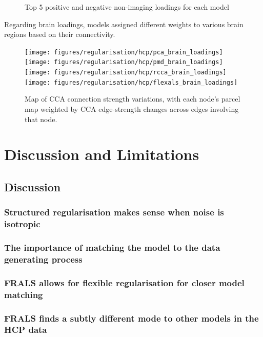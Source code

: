 \begin{figure}[h]
\centering

\caption*{Top 5 positive and negative non-imaging loadings for each model}
\label{fig:behaviour}
\end{figure}

Regarding brain loadings, models assigned different weights to various brain regions based on their connectivity.

\begin{figure}[h]
\centering
\texttt{[image: figures/regularisation/hcp/pca\_brain\_loadings]}
\texttt{[image: figures/regularisation/hcp/pmd\_brain\_loadings]}
\texttt{[image: figures/regularisation/hcp/rcca\_brain\_loadings]}
\texttt{[image: figures/regularisation/hcp/flexals\_brain\_loadings]}
\caption*{Map of CCA connection strength variations, with each node’s parcel map weighted by CCA edge-strength changes across edges involving that node.}
\label{fig:brain}
\end{figure}

\section{Discussion and Limitations}

\subsection{Discussion}

\subsubsection{Structured regularisation makes sense when noise is isotropic}

\subsubsection{The importance of matching the model to the data generating process}

\subsubsection{FRALS allows for flexible regularisation for closer model matching}

\subsubsection{FRALS finds a subtly different mode to other models in the HCP data}

